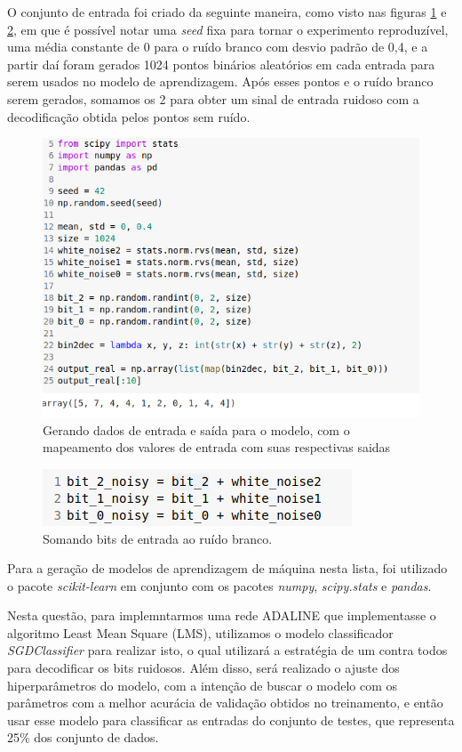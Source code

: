 \documentclass[a4paper, 12pt]{article}
\begin{document}
O conjunto de entrada foi criado da seguinte maneira, como visto nas figuras \ref{fig:quest5_entrada1} e \ref{fig:quest5_entrada2}, em que é possível notar uma \textit{seed} fixa para tornar o experimento reproduzível, uma média constante de 0 para o ruído branco com desvio padrão de 0,4, e a partir daí foram gerados 1024 pontos binários aleatórios em cada entrada para serem usados no modelo de aprendizagem. Após esses pontos e o ruído branco serem gerados, somamos os 2 para obter um sinal de entrada ruidoso com a decodificação obtida pelos pontos sem ruído. 

\begin{figure}[h]
	\centering
 	\includegraphics[width=0.7\linewidth]{figuras/quest5_entrada1.png}
    \caption{Gerando dados de entrada e saída para o modelo, com o mapeamento dos valores de entrada com suas respectivas saidas}
    \label{fig:quest5_entrada1}
\end{figure}
\FloatBarrier

\begin{figure}[h]
	\centering
 	\includegraphics[width=0.6\linewidth]{figuras/quest5_entrada2.png}
    \caption{Somando bits de entrada ao ruído branco.}
    \label{fig:quest5_entrada2}
\end{figure}
\FloatBarrier
Para a geração de modelos de aprendizagem de máquina nesta lista, foi utilizado o pacote \textit{scikit-learn} em conjunto com os pacotes \textit{numpy}, \textit{scipy.stats} e \textit{pandas}.

Nesta questão, para implemntarmos uma rede ADALINE que implementasse o algoritmo Least Mean Square (LMS), utilizamos o modelo classificador \textit{SGDClassifier} para realizar isto, o qual utilizará a estratégia de um contra todos para decodificar os bits ruidosos. Além disso, será realizado o ajuste dos hiperparâmetros do modelo, com a intenção de buscar o modelo com os parâmetros com a melhor acurácia de validação obtidos no treinamento, e então usar esse modelo para classificar as entradas do conjunto de testes, que representa 25\% dos conjunto de dados.
\end{document}
